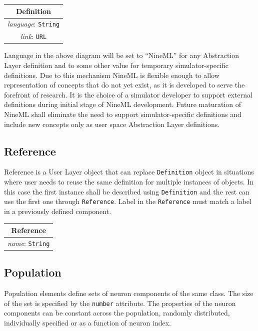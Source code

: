 \documentclass{article}
\begin{document}
\begin{table}[htb]
\center
\begin{tabular}{|c|}
\hline
\hline
Definition \\
\hline
\hline
{\em language}: {\tt String} \\
\hline
{\em link}: {\tt URL}\\
\hline
\end{tabular}
\end{table}

Language in the above diagram will be set to ``NineML'' for any Abstraction
Layer definition and to some other value for temporary simulator-specific
definitions. Due to this mechanism
NineML is flexible enough to allow representation of concepts that do not
yet exist, as it is developed to serve the forefront of research.
It is the choice of a simulator developer to support external definitions
during initial stage of NineML development. Future maturation of NineML shall
eliminate the need to support simulator-specific definitions and include new
concepts only as user space Abstraction Layer definitions.

\subsection{Reference}

Reference is a User Layer object that can replace {\tt Definition} object
in situations where user needs to reuse the same definition for multiple
instances of objects. In this case the first instance shall be described using
{\tt Definition} and the rest can use the first one through {\tt Reference}.
Label in the {\tt Reference} must match a label in a previously defined
component.

\begin{table}[htb]
\center
\begin{tabular}{|c|}
\hline
\hline
Reference \\
\hline
\hline
{\em name}: {\tt String} \\
\hline
\end{tabular}
\end{table}

\subsection{Population}

Population elements define sets of neuron components of the same class. The size of the set is specified by the {\tt number} attribute. The properties of the neuron components can be constant across the population, randomly distributed, individually specified or as a function of neuron index.  
\end{document}
